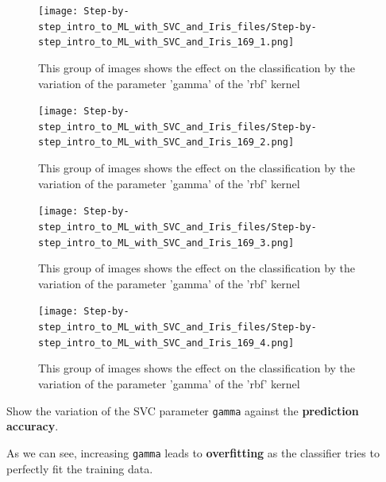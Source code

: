 \documentclass [oneside,10pt,a4paper,ngerman,BCOR10mm,headsepline,parindent,final]{scrartcl}
\begin{document}
    \begin{figure}
        \begin{center}\texttt{[image: Step-by-step\_intro\_to\_ML\_with\_SVC\_and\_Iris\_files/Step-by-step\_intro\_to\_ML\_with\_SVC\_and\_Iris\_169\_1.png]}\end{center}
        \caption{This group of images shows the effect on the classification by the variation of the parameter 'gamma' of the 'rbf' kernel}
        \label{fig:vary_gamma_parameter}
    \end{figure}
    
    \begin{figure}
        \begin{center}\texttt{[image: Step-by-step\_intro\_to\_ML\_with\_SVC\_and\_Iris\_files/Step-by-step\_intro\_to\_ML\_with\_SVC\_and\_Iris\_169\_2.png]}\end{center}
        \caption{This group of images shows the effect on the classification by the variation of the parameter 'gamma' of the 'rbf' kernel}
        \label{fig:vary_gamma_parameter}
    \end{figure}
    
    \begin{figure}
        \begin{center}\texttt{[image: Step-by-step\_intro\_to\_ML\_with\_SVC\_and\_Iris\_files/Step-by-step\_intro\_to\_ML\_with\_SVC\_and\_Iris\_169\_3.png]}\end{center}
        \caption{This group of images shows the effect on the classification by the variation of the parameter 'gamma' of the 'rbf' kernel}
        \label{fig:vary_gamma_parameter}
    \end{figure}
    
    \begin{figure}
        \begin{center}\texttt{[image: Step-by-step\_intro\_to\_ML\_with\_SVC\_and\_Iris\_files/Step-by-step\_intro\_to\_ML\_with\_SVC\_and\_Iris\_169\_4.png]}\end{center}
        \caption{This group of images shows the effect on the classification by the variation of the parameter 'gamma' of the 'rbf' kernel}
        \label{fig:vary_gamma_parameter}
    \end{figure}
    
    Show the variation of the SVC parameter \texttt{gamma} against the
\textbf{prediction accuracy}.

As we can see, increasing \texttt{gamma} leads to \textbf{overfitting}
as the classifier tries to perfectly fit the training data.
\end{document}
